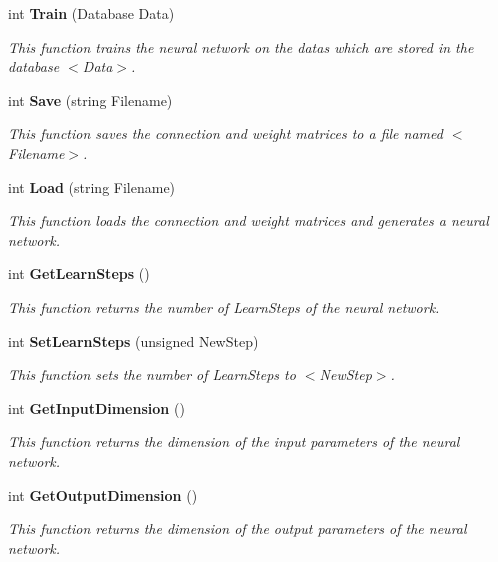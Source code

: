 \begin{CompactItemize}
int {\bf Train} (Database Data)
\begin{CompactList}\small\item\em This function trains the neural network on the datas which are stored in the database $<$Data$>$.\item\end{CompactList}\item 
int {\bf Save} (string Filename)
\begin{CompactList}\small\item\em This function saves the connection and weight matrices to a file named $<$Filename$>$.\item\end{CompactList}\item 
int {\bf Load} (string Filename)
\begin{CompactList}\small\item\em This function loads the connection and weight matrices and generates a neural network.\item\end{CompactList}\item 
int {\bf Get\-Learn\-Steps} ()
\begin{CompactList}\small\item\em This function returns the number of Learn\-Steps of the neural network.\item\end{CompactList}\item 
int {\bf Set\-Learn\-Steps} (unsigned New\-Step)
\begin{CompactList}\small\item\em This function sets the number of Learn\-Steps to $<$New\-Step$>$.\item\end{CompactList}\item 
int {\bf Get\-Input\-Dimension} ()
\begin{CompactList}\small\item\em This function returns the dimension of the input parameters of the neural network.\item\end{CompactList}\item 
int {\bf Get\-Output\-Dimension} ()
\begin{CompactList}\small\item\em This function returns the dimension of the output parameters of the neural network.\item\end{CompactList}\end{CompactItemize}


